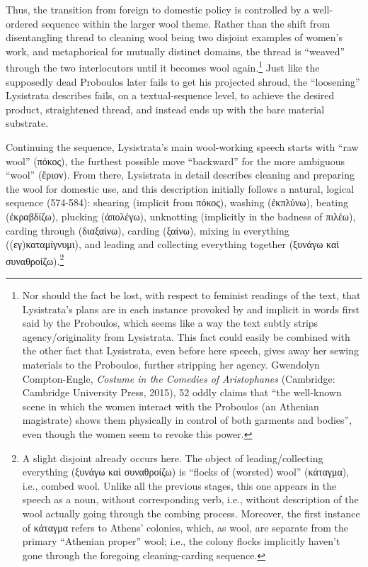 \documentclass[12pt]{article}
\begin{document}
Thus, the transition from foreign to domestic policy is controlled by a well-ordered sequence within the larger wool theme. Rather than the shift from disentangling thread to cleaning wool being two disjoint examples of women's work, and metaphorical for mutually distinct domains, the thread is ``weaved'' through the two interlocutors until it becomes wool again.\footnote{Nor should the fact be lost, with respect to feminist readings of the text, that Lysistrata's plans are in each instance provoked by and implicit in words first said by the Proboulos, which seems like a way the text subtly strips agency/originality from Lysistrata. This fact could easily be combined with the other fact that Lysistrata, even before here speech, gives away her sewing materials to the Proboulos, further stripping her agency. Gwendolyn Compton-Engle, \textit{Costume in the Comedies of Aristophanes} (Cambridge: Cambridge University Press, 2015), 52 oddly claims that ``the well-known scene in which the women interact with the Proboulos (an Athenian magistrate) shows them physically in control of both garments and bodies'', even though the women seem to revoke this power.} Just like the supposedly dead Proboulos later fails to get his projected shroud, the ``loosening'' Lysistrata describes fails, on a textual-sequence level, to achieve the desired product, straightened thread, and instead ends up with the bare material substrate.

Continuing the sequence, Lysistrata's main wool-working speech starts with ``raw wool'' (πόκος), the furthest possible move ``backward'' for the more ambiguous ``wool'' (ἔριον). From there, Lysistrata in detail describes cleaning and preparing the wool for domestic use, and this description initially follows a natural, logical sequence (574-584): shearing (implicit from πόκος), washing (ἐκπλύνω), beating (ἐκραβδίζω), plucking (ἀπολέγω), unknotting (implicitly in the badness of πιλέω), carding through (διαξαίνω), carding (ξαίνω), mixing in everything ((εγ)καταμίγνυμι), and leading and collecting everything together (ξυνάγω καὶ συναθροίζω).\footnote{A slight disjoint already occurs here. The object of leading/collecting everything (ξυνάγω καὶ συναθροίζω) is ``flocks of (worsted) wool'' (κάταγμα), i.e., combed wool. Unlike all the previous stages, this one appears in the speech as a noun, without corresponding verb, i.e., without description of the wool actually going through the combing process. Moreover, the first instance of κάταγμα refers to Athens' colonies, which, as wool, are separate from the primary ``Athenian proper'' wool; i.e., the colony flocks implicitly haven't gone through the foregoing cleaning-carding sequence.}
\end{document}
